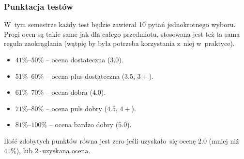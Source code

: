\documentclass[10pt,t]{beamer}
\begin{document}
\begin{frame}
  \frametitle{Punktacja testów}


  W~tym semestrze każdy test będzie zawierał 10 pytań jednokrotnego wyboru.
  Progi ocen są takie same jak dla całego przedmiotu, stosowana jest też ta
  sama reguła zaokrąglania (wątpię by była potrzeba korzystania z~niej
  w~praktyce).

  \vspace{-0.3em}



  \begin{itemize}

  \item $41\%\text{--}50\%$ -- ocena dostateczna ($3.0$).

  \item $51\%\text{--}60\%$ -- ocena plus dostateczna ($3.5$, $3+$).

  \item $61\%\text{--}70\%$ -- ocena dobra ($4.0$).

  \item $71\%\text{--}80\%$ -- ocena puls dobry ($4.5$, $4+$).

  \item $81\%\text{--}100\%$ -- ocena bardzo dobry ($5.0$).

  \end{itemize}

  \vspace{-0.3em}



  Ilość zdobytych punktów równa jest zero jeśli uzyskało~się ocenę $2.0$
  (mniej niż $41\%$), lub $2 \cdot \text{uzyskana ocena}$.

\end{frame}
\end{document}
